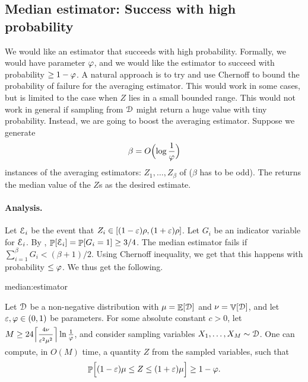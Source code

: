 \subsection{Median estimator: Success with high probability}

We would like an estimator that succeeds with high probability.
Formally, we would have parameter $\varphi$, and we would like the
estimator to succeed with probability $\geq 1 - \varphi$.  A natural
approach is to try and use Chernoff to bound the probability of failure
for the averaging estimator. This would work in some cases, but is
limited to the case when $Z$ lies in a small bounded range. This would
not work in general if sampling from $\EuScript{D}$ might return a huge
value with tiny probability. Instead, we are going to boost the averaging
estimator. Suppose we generate
\begin{equation*}
    \beta = O\Bigl( \log \frac{1}{\varphi } \Bigr)
\end{equation*}
instances of the averaging estimators: $Z_1, \ldots, Z_\beta$ of
 ($\beta$ has to be odd). The
 returns the median
value of the $Z$s as the desired estimate.

\paragraph*{Analysis.}

Let $\EuScript{E}_i$ be the event that $Z_i \in [(1-{\varepsilon})\rho, (1+{\varepsilon})\rho]$.
Let $G_i$ be an indicator variable for $\EuScript{E}_i$. By
, $\Prob{\Event_i} = \Prob{G_i=1} \geq 3/4$.
The median estimator fails if $\sum_{i=1}^\beta G_i < (\beta+1)/2$. Using Chernoff
inequality, we get that this happens with probability $\leq \varphi$. We
thus get the following.


\begin{fragment}{median:estimator}
\begin{theorem}
    Let $\EuScript{D}$ be a non-negative distribution with
    $\mu = \mathop{\mathbb{E}}\!\left[ {\EuScript{D}} \right]$ and $\nu = \mathop{\mathbb{V}}\!\left[ {\EuScript{D}} \right]$, and
    let ${\varepsilon}, \varphi \in (0,1)$ be parameters.  For some absolute
    constant $c >0$, let
    $M \geq 24 \Bigl\lceil{ \frac{4 \nu\bigr.}{{\varepsilon}^2\mu^2\bigr.}  }
    \Bigr\rceil \ln \frac{1}{\varphi}$, and consider sampling
    variables $X_1, \ldots, X_M \sim \EuScript{D}$. One can compute,
    in $O(M)$ time, a quantity $Z$ from the sampled variables, such
    that
    \begin{equation*}
        \Prob{ (1-\eps)\mu \leq Z \leq (1+\eps)\mu \Bigr.} \geq 1 -
        \BadProb.
    \end{equation*}
\end{theorem}
\end{fragment}

